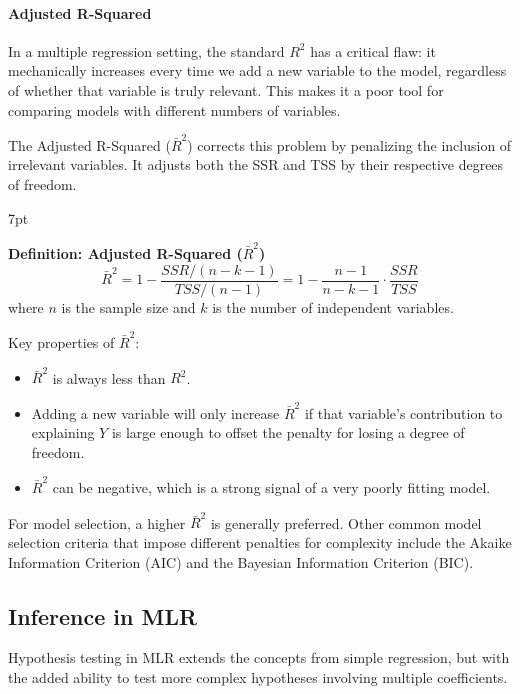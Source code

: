\documentclass{article}
\providecommand{\tightlist}{
  \setlength{\itemsep}{0pt}
  \setlength{\parskip}{0pt}}
\newenvironment{greenblock}{%
\def\FrameCommand{%
  \hspace{1pt}%
    {\color{Green}%
    \vrule width 2pt}%
    {\color{greenshade}%
    \vrule width 4pt}%
  \colorbox{greenshade}%
}%
\MakeFramed{%
  \advance%
  \hsize-%
  \width%
  \FrameRestore}%
\noindent\hspace{-4.55pt}%
\begin{adjustwidth}{}{7pt}%
\vspace{2pt}\vspace{2pt}%
}
{%
\vspace{2pt}\end{adjustwidth}\endMakeFramed%
}
\begin{document}
\paragraph{Adjusted R-Squared}
In a multiple regression setting, the standard $R^2$ has a critical flaw: it mechanically increases every time we add a new variable to the model, regardless of whether that variable is truly relevant. This makes it a poor tool for comparing models with different numbers of variables.

The Adjusted R-Squared ($\bar{R}^2$) corrects this problem by penalizing the inclusion of irrelevant variables. It adjusts both the SSR and TSS by their respective degrees of freedom.

\begin{greenblock}
\textbf{Definition: Adjusted R-Squared ($\bar{R}^2$)}
\begin{equation}
  \bar R^2 = 1-\frac{SSR/(n-k-1)}{TSS/(n-1)}=1-\frac{n-1}{n-k-1} \cdot \frac{SSR}{TSS}
\end{equation}
where $n$ is the sample size and $k$ is the number of independent variables.
\end{greenblock}

Key properties of $\bar{R}^2$:
\begin{itemize}
    \tightlist
    \item $\bar{R}^2$ is always less than $R^2$.
    \item Adding a new variable will only increase $\bar{R}^2$ if that variable's contribution to explaining $Y$ is large enough to offset the penalty for losing a degree of freedom.
    \item $\bar{R}^2$ can be negative, which is a strong signal of a very poorly fitting model.
\end{itemize}
For model selection, a higher $\bar{R}^2$ is generally preferred. Other common model selection criteria that impose different penalties for complexity include the Akaike Information Criterion (AIC) and the Bayesian Information Criterion (BIC).





\subsection{Inference in MLR}
\label{sub:inference_in_mlr}

Hypothesis testing in MLR extends the concepts from simple regression, but with the added ability to test more complex hypotheses involving multiple coefficients.
\end{document}
